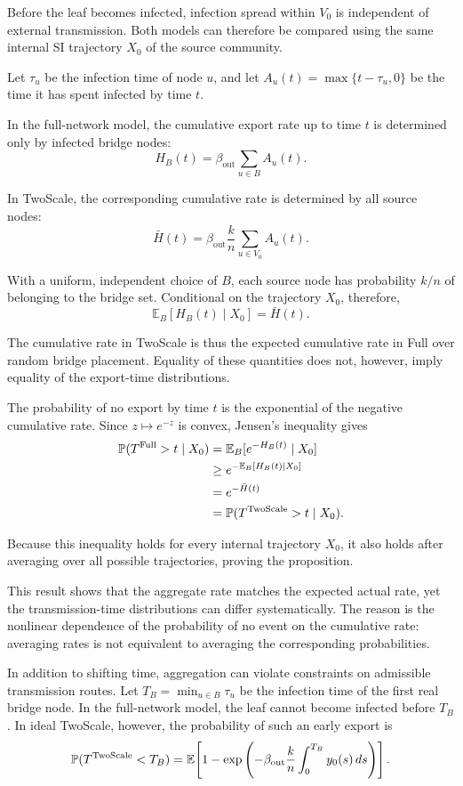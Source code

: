 \documentclass{ieeeaccess}
\newenvironment{proof}{\begin{IEEEproof}}{\end{IEEEproof}}
\newcommand{\Full}{\textup{Full}}
\newcommand{\TS}{\textup{TwoScale}}
\begin{document}
\begin{proof}
Before the leaf becomes infected, infection spread within $V_0$ is independent of external transmission. Both models can therefore be compared using the same internal SI trajectory $X_0$ of the source community.

Let $\tau_u$ be the infection time of node $u$, and let $A_u(t)=\max\{t-\tau_u,0\}$ be the time it has spent infected by time $t$.

In the full-network model, the cumulative export rate up to time $t$ is determined only by infected bridge nodes:
\[
H_B(t)
=
\beta_{\mathrm{out}}\sum_{u\in B}A_u(t).
\]

In \TS{}, the corresponding cumulative rate is determined by all source nodes:
\[
\bar H(t)
=
\beta_{\mathrm{out}}\frac{k}{n}
\sum_{u\in V_0}A_u(t).
\]

With a uniform, independent choice of $B$, each source node has probability $k/n$ of belonging to the bridge set. Conditional on the trajectory $X_0$, therefore,
\[
\mathbb{E}_B[H_B(t)\mid X_0]
=
\bar H(t).
\]

The cumulative rate in \TS{} is thus the expected cumulative rate in \Full{} over random bridge placement. Equality of these quantities does not, however, imply equality of the export-time distributions.

The probability of no export by time $t$ is the exponential of the negative cumulative rate. Since $z\mapsto e^{-z}$ is convex, Jensen's inequality gives
\[
\begin{aligned}
\mathbb{P}(T^{\Full}>t\mid X_0)
&=
\mathbb{E}_B[e^{-H_B(t)}\mid X_0]
\\
&\geq
e^{-\mathbb{E}_B[H_B(t)\mid X_0]}
\\
&=
e^{-\bar H(t)}
\\
&=
\mathbb{P}(T^{\TS}>t\mid X_0).
\end{aligned}
\]

Because this inequality holds for every internal trajectory $X_0$, it also holds after averaging over all possible trajectories, proving the proposition.
\end{proof}

This result shows that the aggregate rate matches the expected actual rate, yet the transmission-time distributions can differ systematically. The reason is the nonlinear dependence of the probability of no event on the cumulative rate: averaging rates is not equivalent to averaging the corresponding probabilities.

In addition to shifting time, aggregation can violate constraints on admissible transmission routes. Let $T_B=\min_{u\in B}\tau_u$ be the infection time of the first real bridge node. In the full-network model, the leaf cannot become infected before $T_B$. In ideal \TS{}, however, the probability of such an early export is
\begin{equation}
\label{eq:bypass}
\mathbb{P}(T^{\TS}<T_B)
=
\mathbb{E}\!\left[
1-\exp\left(
-\beta_{\mathrm{out}}\frac{k}{n}
\int_0^{T_B}y_0(s)\,ds
\right)
\right].
\end{equation}
\end{document}
